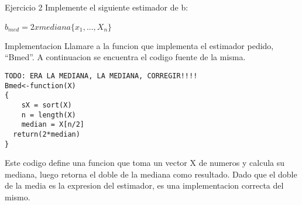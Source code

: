 
\begin{section}{Ejercicio 2}
Implemente el siguiente estimador de b:

$\hat{b}_{med} = 2xmediana\{x_1, ... ,X_n	\}$



\begin{subsection}{Implementacion}
Llamare a la funcion que implementa el estimador pedido, ``Bmed''. A continuacion se encuentra el codigo fuente de la misma.
\begin{verbatim}
TODO: ERA LA MEDIANA, LA MEDIANA, CORREGIR!!!!
Bmed<-function(X)
{
	sX = sort(X)
	n = length(X)
    median = X[n/2]
  return(2*median)
}
\end{verbatim}

Este codigo define una funcion que toma un vector X de numeros y calcula su mediana, luego retorna el doble de la mediana como resultado. Dado que el doble de la media es la expresion del estimador, es una implementacion correcta del mismo.


\end{subsection}
\end{section}

